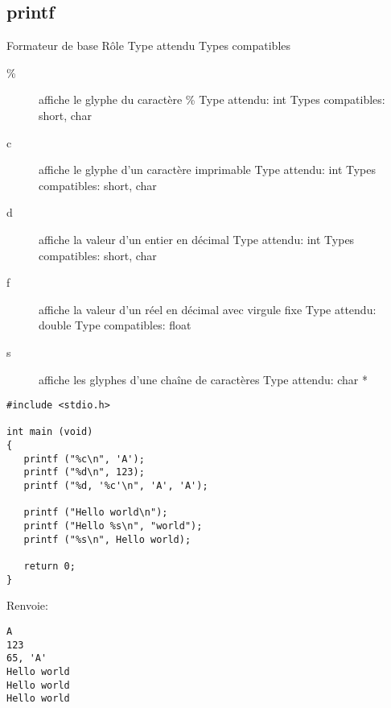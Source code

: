 \documentclass[a4paper]{article}
\begin{document}
\subsection{printf}
Formateur de base 	Rôle 	Type attendu 	Types compatibles
\begin{description}
  \item  [\%] 	affiche le glyphe du caractère \% 	Type attendu: int 	Types compatibles: short, char
  \item  [c]	affiche le glyphe d'un caractère imprimable 	Type attendu: int 	Types compatibles: short, char
  \item  [d]	affiche la valeur d'un entier en décimal 	Type attendu: int 	Types compatibles: short, char
  \item  [f]	affiche la valeur d'un réel en décimal avec virgule fixe 	Type attendu: double Type compatibles: float
  \item  [s]	affiche les glyphes d'une chaîne de caractères 	Type attendu: char *
\end{description}
\begin{lstlisting}
#include <stdio.h>

int main (void)
{
   printf ("%c\n", 'A');
   printf ("%d\n", 123);
   printf ("%d, '%c'\n", 'A', 'A');

   printf ("Hello world\n");
   printf ("Hello %s\n", "world");
   printf ("%s\n", Hello world);

   return 0;
}
\end{lstlisting}
Renvoie:
\begin{lstlisting}
A
123
65, 'A'
Hello world
Hello world
Hello world
\end{lstlisting}
\end{document}
